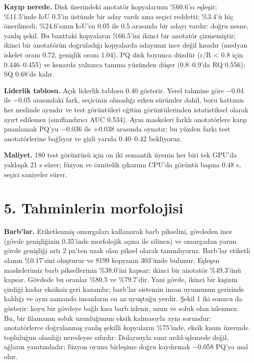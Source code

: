 \textbf{Kayıp nerede.} Disk üzerindeki anotatör kopyalarının \%60.6'sı eşleşir; \%11.5'inde IoU 0.5'in
üstünde bir aday vardı ama seçici reddetti; \%3.4'ü hiç önerilmedi; \%24.6'sının IoU'su 0.05 ile 0.5
arasında bir adayı vardır: doğru nesne, yanlış şekil. Bu banttaki kopyaların \%66.5'ini ikinci bir
anotatör çizmemiştir; ikinci bir anotatörün doğruladığı kopyalarda adayımız ince değil kısadır
(medyan iskelet oranı 0.72, genişlik oranı 1.04). PQ disk boyunca düzdür (r/R \textless{} 0.8 için
0.446--0.455) ve kenarda yalnızca tanıma yüzünden düşer (0.8--0.9'da RQ 0.556); SQ 0.68'de kalır.

\textbf{Liderlik tablosu.} Açık liderlik tablosu 0.40 gösterir. Yerel tahmine göre $-$0.04 ile $-$0.05
arasındaki fark, seçicinin olmadığı erken sürümler dahil, boru hattının her neslinde aynıdır ve
test görüntüleri eğitim görüntülerinden istatistiksel olarak ayırt edilemez (sınıflandırıcı AUC
0.534). Aynı maskeleri farklı anotatörlere karşı puanlamak PQ'yu $-$0.036 ile +0.038 arasında
oynatır; bu yüzden farkı test anotatörlerine bağlıyor ve gizli yarıda 0.40--0.42 bekliyoruz.

\textbf{Maliyet.} 180 test görüntüsü için on iki semantik üyenin her biri tek GPU'da yaklaşık 21 s
sürer; füzyon ve öznitelik çıkarımı CPU'da görüntü başına 0.48 s, seçici saniyeler sürer.

\section{5. Tahminlerin morfolojisi}\label{tahminlerin-morfolojisi}

\textbf{Barb'lar.} Etiketlenmiş omurgaları kullanarak barb pikselini, gövdeden ince (gövde genişliğinin
0.35'inde morfolojik açma ile silinen) ve omurgadan yarım gövde genişliği artı 2 px'ten uzak olan
piksel olarak tanımlıyoruz. Barb'lar etiketli alanın \%0.17'sini oluşturur ve 8199 kopyanın
303'ünde bulunur. Eşleşen maskelerimiz barb piksellerinin \%38.0'ini kapsar; ikinci bir anotatör
\%49.3'ünü kapsar. Gövdede bu oranlar \%80.5 ve \%79.7'dir. Yani gövde, ikinci bir kişinin çizdiği
kadar eksiksiz geri kazanılır; barb'lar sistemin insan uyumunun gerisinde kaldığı ve aynı zamanda
insanların en az uyuştuğu yerdir. Şekil 1 iki sonucu da gösterir: koyu bir gövdeye bağlı kısa barb
izlenir, uzun ve soluk olan izlenmez. Bu, bir filamanın soluk uzunluğunun eksik kalmasıyla aynı
sorundur: anotatörlerce doğrulanmış yanlış şekilli kopyaların \%75'inde, eksik kısım üzerinde
topluluğun olasılığı neredeyse sıfırdır. Dolayısıyla sınır ardıl-işlemede değil, ağların
yanıtındadır; füzyon oyunu birleşime doğru kaydırmak $-$0.058 PQ'ya mal olur.

